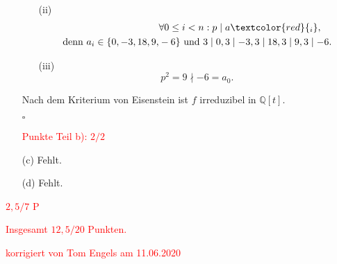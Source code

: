 \documentclass[12pt]{article}
\newcommand{\corr}[1]{\textcolor{red}{#1}}
\newcommand{\QED}{\begin{flushright} $\square$ \end{flushright}}
\begin{document}
\begin{enumerate}
\begin{enumerate}
		\item[(ii)] 
		\begin{align*}
			&\forall0\leq i<n:p\mid a\corr{_i}, \\
			\text{denn } a_i\in\{0,-3,18,9,&-6\}\text{ und }3\mid0,3\mid -3, 3\mid18,3\mid9,3\mid-6.
		\end{align*}
		
		\item[(iii)] $$p^2=9\nmid-6=a_0.$$
	\end{enumerate}
	Nach dem Kriterium von Eisenstein ist $f$ irreduzibel in $\mathbb{Q}[t]$.
	\QED
\corr{Punkte Teil b): $2/2$}
	
	\item[(c)] Fehlt.
	
	\item[(d)] Fehlt.
\end{enumerate}
\corr{$2,5/7$ P}

\bigskip

\corr{Insgesamt $12,5/20$ Punkten.}



\bigskip

\corr{korrigiert von Tom Engels am 11.06.2020}
\end{document}
